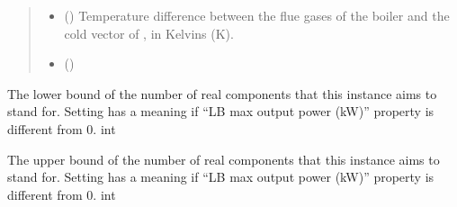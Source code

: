 \documentclass[letterpaper,10pt,english]{sphinxmanual}
\begin{document}
\begin{fulllineitems}
\begin{fulllineitems}
\begin{quote}
\begin{description}
\begin{itemize}
\item {} 
\sphinxAtStartPar
{} (\sphinxstyleliteralemphasis{\sphinxupquote{, }}) \textendash{} Temperature difference between the flue gases of the boiler and the cold vector of , in Kelvins (K).

\item {} 
\sphinxAtStartPar
{} () \textendash{} 

\end{itemize}

\end{description}\end{quote}

\end{fulllineitems}


\begin{fulllineitems}
\label{\detokenize{generated/tamos.production.CHP:tamos.production.CHP.units_number_lb}}
\pysigstartsignatures
{}
\pysigstopsignatures
\sphinxAtStartPar
The lower bound of the number of real components that this instance aims to stand for.
Setting  has a meaning if “LB max output power (kW)” property is different from 0.
int

\end{fulllineitems}


\begin{fulllineitems}
\label{\detokenize{generated/tamos.production.CHP:tamos.production.CHP.units_number_ub}}
\pysigstartsignatures
{}
\pysigstopsignatures
\sphinxAtStartPar
The upper bound of the number of real components that this instance aims to stand for.
Setting  has a meaning if “LB max output power (kW)” property is different from 0.
int


\end{fulllineitems}
\end{fulllineitems}
\end{document}
